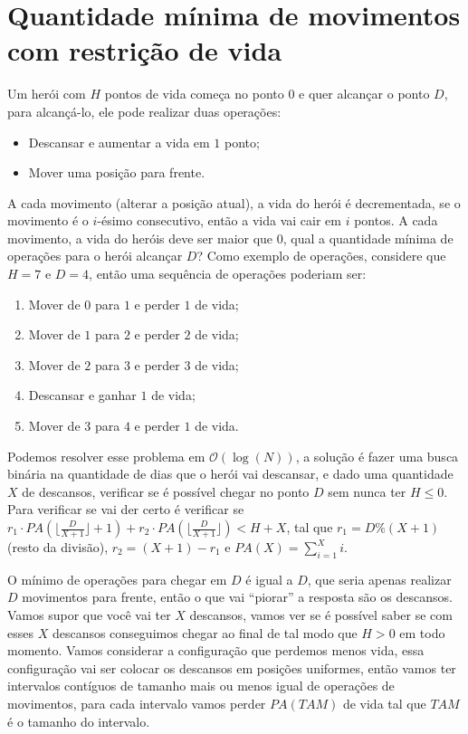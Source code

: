 
\section{Quantidade mínima de movimentos com restrição de vida}
Um herói com $H$ pontos de vida começa no ponto $0$ e quer alcançar o ponto $D$, para alcançá-lo, ele pode realizar duas operações:
\begin{itemize}
    \item Descansar e aumentar a vida em $1$ ponto;
    \item Mover uma posição para frente.
\end{itemize}
A cada movimento (alterar a posição atual), a vida do herói é decrementada, se o movimento é o $i$-ésimo consecutivo, então a vida vai cair em $i$ pontos. A cada movimento, a vida do heróis deve ser maior que $0$, qual a quantidade mínima de operações para o herói alcançar $D$? Como exemplo de operações, considere que $H = 7$ e $D = 4$, então uma sequência de operações poderiam ser:
\begin{enumerate}
    \item Mover de $0$ para $1$ e perder $1$ de vida;
    \item Mover de $1$ para $2$ e perder $2$ de vida;
    \item Mover de $2$ para $3$ e perder $3$ de vida;
    \item Descansar e ganhar $1$ de vida;
    \item Mover de $3$ para $4$ e perder $1$ de vida.
\end{enumerate}

Podemos resolver esse problema em $\mathcal{O}(\log(N))$, a solução é fazer uma busca binária na quantidade de dias que o herói vai descansar, e dado uma quantidade $X$ de descansos, verificar se é possível chegar no ponto $D$ sem nunca ter $H \le 0$. Para verificar se vai der certo é verificar se $r_1 \cdot PA\left(\lfloor\frac{D}{X+1}\rfloor + 1\right) + r_2 \cdot PA\left(\lfloor\frac{D}{X+1}\rfloor\right) < H + X$, tal que $r_1 = D\% (X+1)$ (resto da divisão), $r_2 = (X+1) - r_1$ e $PA(X) = \sum_{i=1}^X i$.

O mínimo de operações para chegar em $D$ é igual a $D$, que seria apenas realizar $D$ movimentos para frente, então o que vai ``piorar'' a resposta são os descansos. Vamos supor que você vai ter $X$ descansos, vamos ver se é possível saber se com esses $X$ descansos conseguimos chegar ao final de tal modo que $H > 0$ em todo momento. Vamos considerar a configuração que perdemos menos vida, essa configuração vai ser colocar os descansos em posições uniformes, então vamos ter intervalos contíguos de tamanho mais ou menos igual de operações de movimentos, para cada intervalo vamos perder $PA(TAM)$ de vida tal que $TAM$ é o tamanho do intervalo.

